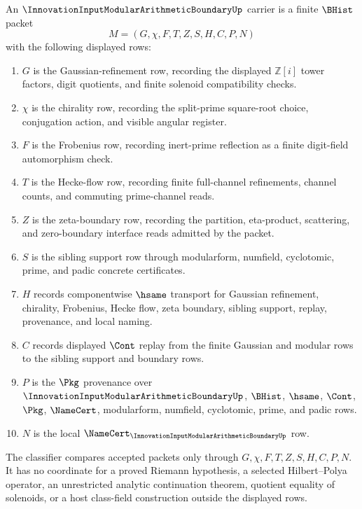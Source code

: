 \begin{definition}
\label{def:innovation-input-modular-arithmetic-boundary-carrier}
An $\InnovationInputModularArithmeticBoundaryUp$ carrier is a finite $\BHist$ packet
$$
M=(G,\chi,F,T,Z,S,H,C,P,N)
$$
with the following displayed rows:
\begin{enumerate}
\item $G$ is the Gaussian-refinement row, recording the displayed $\mathbb Z[i]$ tower factors, digit quotients, and finite solenoid compatibility checks.
\item $\chi$ is the chirality row, recording the split-prime square-root choice, conjugation action, and visible angular register.
\item $F$ is the Frobenius row, recording inert-prime reflection as a finite digit-field automorphism check.
\item $T$ is the Hecke-flow row, recording finite full-channel refinements, channel counts, and commuting prime-channel reads.
\item $Z$ is the zeta-boundary row, recording the partition, eta-product, scattering, and zero-boundary interface reads admitted by the packet.
\item $S$ is the sibling support row through modularform, numfield, cyclotomic, prime, and padic concrete certificates.
\item $H$ records componentwise $\hsame$ transport for Gaussian refinement, chirality, Frobenius, Hecke flow, zeta boundary, sibling support, replay, provenance, and local naming.
\item $C$ records displayed $\Cont$ replay from the finite Gaussian and modular rows to the sibling support and boundary rows.
\item $P$ is the $\Pkg$ provenance over $\InnovationInputModularArithmeticBoundaryUp$, $\BHist$, $\hsame$, $\Cont$, $\Pkg$, $\NameCert$, modularform, numfield, cyclotomic, prime, and padic rows.
\item $N$ is the local $\NameCert_{\InnovationInputModularArithmeticBoundaryUp}$ row.
\end{enumerate}
The classifier compares accepted packets only through $G,\chi,F,T,Z,S,H,C,P,N$. It has no coordinate for a proved Riemann hypothesis, a selected Hilbert--Polya operator, an unrestricted analytic continuation theorem, quotient equality of solenoids, or a host class-field construction outside the displayed rows.
\end{definition}

